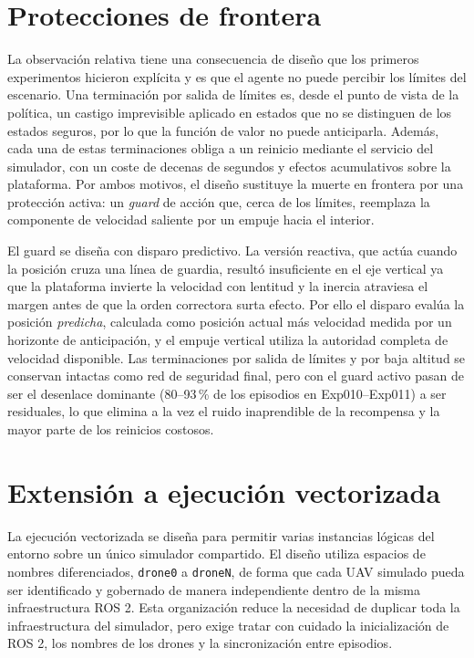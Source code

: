 \section{Protecciones de frontera} \label{sct:aplicacion:guards}

La observación relativa tiene una consecuencia de diseño que los primeros
experimentos hicieron explícita y es que el agente no puede percibir los límites del
escenario. Una terminación por salida de límites es, desde el punto de vista de
la política, un castigo imprevisible aplicado en estados que no se distinguen de
los estados seguros, por lo que la función de valor no puede anticiparla. Además,
cada una de estas terminaciones obliga a un reinicio mediante el servicio del
simulador, con un coste de decenas de segundos y efectos acumulativos sobre la
plataforma. Por ambos motivos, el diseño sustituye la muerte en frontera por una
protección activa: un \emph{guard} de acción que, cerca de los límites, reemplaza
la componente de velocidad saliente por un empuje hacia el interior.

El guard se diseña con disparo predictivo. La versión reactiva, que actúa cuando
la posición cruza una línea de guardia, resultó insuficiente en el eje vertical ya que
la plataforma invierte la velocidad con lentitud y la inercia atraviesa el margen
antes de que la orden correctora surta efecto. Por ello el disparo evalúa la
posición \emph{predicha}, calculada como posición actual más velocidad medida por
un horizonte de anticipación, y el empuje vertical utiliza la autoridad completa
de velocidad disponible. Las terminaciones por salida de límites y por baja
altitud se conservan intactas como red de seguridad final, pero con el guard
activo pasan de ser el desenlace dominante (80--93\,\% de los episodios en
Exp010--Exp011) a ser residuales, lo que elimina a la vez el ruido inaprendible
de la recompensa y la mayor parte de los reinicios costosos.

\section{Extensión a ejecución vectorizada} \label{sct:aplicacion:vectorizacion}

La ejecución vectorizada se diseña para permitir varias instancias lógicas del
entorno sobre un único simulador compartido. El diseño utiliza espacios de nombres
diferenciados, \texttt{drone0} a \texttt{droneN}, de forma que cada UAV simulado
pueda ser identificado y gobernado de manera independiente dentro de la misma
infraestructura ROS 2. Esta organización reduce la necesidad de duplicar toda la
infraestructura del simulador, pero exige tratar con cuidado la inicialización de
ROS 2, los nombres de los drones y la sincronización entre episodios.

